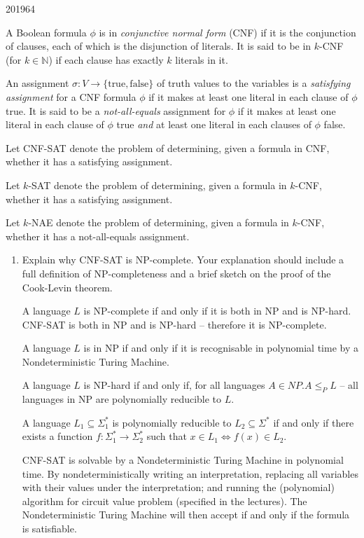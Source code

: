 \documentclass[10pt,\jkfside,a4paper]{article}
\begin{document}
\begin{examquestion}{2019}{6}{4}

A Boolean formula $\phi$ is in \textit{conjunctive normal form} (CNF) if it
is the conjunction of clauses, each of which is the disjunction of literals.
It is said to be in $k$-CNF (for $k \in \mathbb N$) if each clause has
exactly $k$ literals in it.

An assignment $\sigma : V \to \{\text{true}, \text{false}\}$ of truth values
to the variables is a \textit{satisfying assignment} for a CNF formula $\phi$
if it makes at least one literal in each clause of $\phi$ true. It is said
to be a \textit{not-all-equals} assignment for $\phi$ if it makes at least
one literal in each clause of $\phi$ true \textit{and} at least one literal
in each clauses of $\phi$ false.

Let CNF-SAT denote the problem of determining, given a formula in CNF,
whether it has a satisfying assignment.

Let $k$-SAT denote the problem of determining, given a formula in $k$-CNF,
whether it has a satisfying assignment.

Let $k$-NAE denote the problem of determining, given a formula in $k$-CNF,
whether it has a not-all-equals assignment.

\begin{enumerate}[label=(\alph*)]

\item Explain why CNF-SAT is NP-complete. Your explanation should include a
full definition of NP-completeness and a brief sketch on the proof of the
Cook-Levin theorem.

A language $L$ is NP-complete if and only if it is both in NP and is NP-hard.
CNF-SAT is both in NP and is NP-hard -- therefore it is NP-complete.

A language $L$ is in NP if and only if it is recognisable in polynomial time
by a Nondeterministic Turing Machine.

A language $L$ is NP-hard if and only if, for all languages $A \in NP. A \le
_P L$ -- all languages in NP are polynomially reducible to $L$.

A language $L_1 \subseteq \Sigma_1^*$ is polynomially reducible to $L_2 \subseteq \Sigma^*$
if and only if there exists a function $f: \Sigma_1^* \to \Sigma_2^*$ such
that $x \in L_1 \iff f(x) \in L_2$.

CNF-SAT is solvable by a Nondeterministic Turing Machine in polynomial time.
By nondeterministically writing an interpretation, replacing all variables
with their values under the interpretation; and running the (polynomial)
algorithm for circuit value problem (specified in the lectures). The
Nondeterministic Turing Machine will then accept if and only if the formula
is satisfiable.


\end{enumerate}
\end{examquestion}
\end{document}
